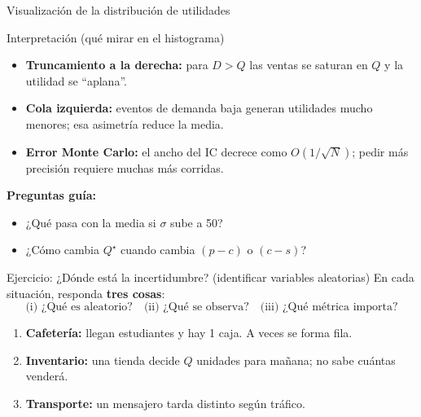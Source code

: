 \documentclass[aspectratio=1610, 9pt]{beamer}
\begin{document}
\begin{frame}[fragile]{Visualización de la distribución de utilidades}
\end{frame}

\begin{frame}{Interpretación (qué mirar en el histograma)}
\begin{itemize}
  \item \textbf{Truncamiento a la derecha:} para $D>Q$ las ventas se saturan en $Q$ y la utilidad se ``aplana''.
  \item \textbf{Cola izquierda:} eventos de demanda baja generan utilidades mucho menores; esa asimetría reduce la media.
  \item \textbf{Error Monte Carlo:} el ancho del IC decrece como $O(1/\sqrt{N})$; pedir más precisión requiere muchas más corridas.
\end{itemize}

\textbf{Preguntas guía:}
\begin{itemize}
  \item ¿Qué pasa con la media si $\sigma$ sube a 50?
  \item ¿Cómo cambia $Q^\star$ cuando cambia $(p-c)$ o $(c-s)$?
\end{itemize}
\end{frame}


\begin{frame}{Ejercicio: ¿Dónde está la incertidumbre? (identificar variables aleatorias)}
En cada situación, responda \textbf{tres cosas}:
\[
\text{(i) ¿Qué es aleatorio?}\quad
\text{(ii) ¿Qué se observa?}\quad
\text{(iii) ¿Qué métrica importa?}
\]

\vspace{0.2cm}
\begin{enumerate}
  \item \textbf{Cafetería:} llegan estudiantes y hay 1 caja. A veces se forma fila.
  \item \textbf{Inventario:} una tienda decide $Q$ unidades para mañana; no sabe cuántas venderá.
  \item \textbf{Transporte:} un mensajero tarda distinto según tráfico.
\end{enumerate}

\end{frame}
\end{document}
